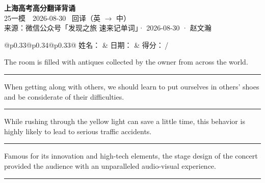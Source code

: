 \documentclass[11pt,a4paper]{article}
\newcommand{\num}[1]{\makebox[1.9em][r]{#1.}\hspace{0.3em}}
\newcommand{\wline}{\noindent\rule{\linewidth}{0.4pt}}
\begin{document}
\pagestyle{plain}
\begin{center}
{\LARGE\bfseries 上海高考高分翻译背诵 }\\[0.25em]
{\large 25一模　2026-08-30 \quad\ 回译（英 $\to$ 中）}\\[0.35em]
{\footnotesize 来源：微信公众号「发现之旅 速来记单词」· 2026-08-30 · 赵文瀚}
\end{center}

\vspace{0.4em}
\noindent\begin{tabular}{@{}p{0.33\textwidth}@{}p{0.34\textwidth}@{}p{0.33\textwidth}@{}}
姓名：\underline{\hspace{2.0cm}} & 日期：\underline{\hspace{2.0cm}} & 得分：\underline{\hspace{1.4cm}}\,/ \\
\end{tabular}

\vspace{0.5em}

\vspace{0.8em}
\num{1}The room is filled with antiques collected by the owner from across the world.

\vspace{0.25em}

\wline

\num{2}When getting along with others, we should learn to put ourselves in others’ shoes and be considerate of their difficulties.

\vspace{0.25em}

\wline

\num{3}While rushing through the yellow light can save a little time, this behavior is highly likely to lead to serious traffic accidents.

\vspace{0.25em}

\wline

\num{4}Famous for its innovation and high-tech elements, the stage design of the concert provided the audience with an unparalleled audio-visual experience.

\vspace{0.25em}

\wline
\end{document}
